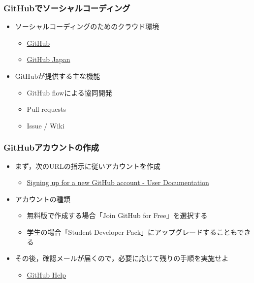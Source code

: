 \documentclass[a4paper,twoside,twocolumn]{bxjsarticle}
\begin{document}
\subsubsection{GitHubでソーシャルコーディング}
\label{sec-2-1-1}
\begin{itemize}
\item ソーシャルコーディングのためのクラウド環境
\begin{itemize}
\item \href{https://github.com/}{GitHub}
\item \href{http://github.co.jp/}{GitHub Japan}
\end{itemize}
\item GitHubが提供する主な機能
\begin{itemize}
\item GitHub flowによる協同開発
\item Pull requests
\item Issue / Wiki
\end{itemize}
\end{itemize}

\subsubsection{GitHubアカウントの作成}
\label{sec-2-1-2}
\begin{itemize}
\item まず，次のURLの指示に従いアカウントを作成
\begin{itemize}
\item \href{https://help.github.com/articles/signing-up-for-a-new-github-account/}{Signing up for a new GitHub account - User Documentation}
\end{itemize}
\item アカウントの種類
\begin{itemize}
\item 無料版で作成する場合「Join GitHub for Free」を選択する
\item 学生の場合「Student Developer Pack」にアップグレードすることもできる
\end{itemize}
\item その後，確認メールが届くので，必要に応じて残りの手順を実施せよ
\begin{itemize}
\item \href{https://help.github.com/categories/setup/}{GitHub Help}
\end{itemize}
\end{itemize}
\end{document}
